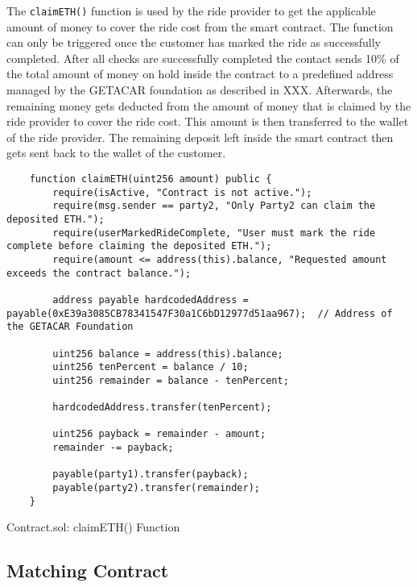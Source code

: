 The \texttt{claimETH()} function is used by the ride provider to get the applicable amount of money to cover the ride cost from the smart contract. The function can only be triggered once the customer has marked the ride as successfully completed. After all checks are successfully completed the contact sends 10\% of the total amount of money on hold inside the contract to a predefined address managed by the GETACAR foundation as described in XXX. Afterwards, the remaining money gets deducted from the amount of money that is claimed by the ride provider to cover the ride cost. This amount is then transferred to the wallet of the ride provider. The remaining deposit left inside the smart contract then gets sent back to the wallet of the customer. 

\lstset{
  basicstyle=\footnotesize\ttfamily,
  breaklines=true,
  numbers=left,
  firstnumber=232
}

\begin{Listing}
\begin{lstlisting}
    function claimETH(uint256 amount) public {
        require(isActive, "Contract is not active.");
        require(msg.sender == party2, "Only Party2 can claim the deposited ETH.");
        require(userMarkedRideComplete, "User must mark the ride complete before claiming the deposited ETH.");
        require(amount <= address(this).balance, "Requested amount exceeds the contract balance.");
        
        address payable hardcodedAddress = payable(0xE39a3085CB78341547F30a1C6bD12977d51aa967);  // Address of the GETACAR Foundation

        uint256 balance = address(this).balance;
        uint256 tenPercent = balance / 10;
        uint256 remainder = balance - tenPercent;

        hardcodedAddress.transfer(tenPercent);

        uint256 payback = remainder - amount;
        remainder -= payback;

        payable(party1).transfer(payback);
        payable(party2).transfer(remainder);
    }
\end{lstlisting}
  \caption{Contract.sol: claimETH() Function}
  \label{lst:claimETH}
\end{Listing}


\subsection{Matching Contract}

